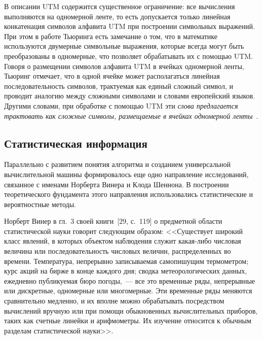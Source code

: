 \begin{multicols}{2}
      В описании UTM содержится существенное ограничение: все вычисления выполняются
на одномерной ленте, то есть допускается только линейная конкатенация символов алфавита
UTM при построении символьных выражений. При этом в работе Тьюринга есть замечание о
том, что в математике используются двумерные символьные выражения, которые всегда могут
быть преобразованы в одномерные, что позволяет обрабатывать их с помощью UTM. Говоря о
размещении символов алфавита UTM в ячейках одномерной ленты, Тьюринг отмечает, что в
одной ячейке может располагаться линейная последовательность символов, трактуемая как
единый сложный символ, и проводит аналогию между сложными символами и словами
европейский языков. Другими словами, при обработке с помощью UTM эти \textit{слова
предлагается трактовать как сложные символы, размещаемые в ячейках одномерной
ленты}~\cite{28za}.

\subsection{Статистическая информация} %

      Параллельно с развитием понятия алгоритма и созданием универсальной
вычислительной машины формировалось еще одно направление исследований, связанное с
именами Норберта Винера и Клода Шеннона. В построении теоретического фундамента этого
направления использовались статистические и вероятностные методы.

      Норберт Винер в гл.~3 своей книги~[29, с.~119] о предметной области
статистической науки говорит следующим образом: <<Существует широкий класс явлений, в
которых объектом наблюдения служит какая-либо числовая величина или последовательность
числовых величин, распределенных во времени. Температура, непрерывно записываемая
самопишущим термометром; курс акций на бирже в конце каждого дня; сводка
метеорологических данных, ежедневно публикуемая бюро погоды,~--- все это временные ряды,
непрерывные или дискретные, одномерные или многомерные. Эти временные ряды меняются
сравнительно медленно, и их вполне можно обрабатывать посредством вычислений вручную
или при помощи обыкновенных вычислительных приборов, таких как счетные линейки и
арифмометры. Их изучение относится к обычным разделам статистической
науки>>.


\end{multicols}
